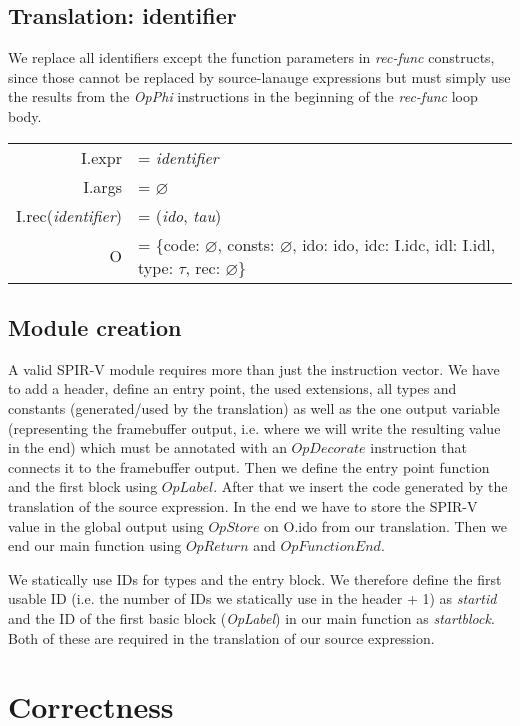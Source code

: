 \documentclass[letterpaper,12pt]{article}
\begin{document}
\subsection{Translation: identifier}

We replace all identifiers except the function parameters in \textit{rec-func}
constructs, since those cannot be replaced by source-lanauge expressions
but must simply use the results from the \textit{OpPhi} instructions
in the beginning of the \textit{rec-func} loop body.

\medskip
\begin{tabularx}{\linewidth}{rl}
	I.expr &= \textit{identifier} \\
	I.args &= $\varnothing$ \\
	I.rec(\textit{identifier}) &= (\textit{ido}, \textit{tau}) \\
	O &= \{code: $\varnothing$, consts: $\varnothing$, ido: ido, idc: I.idc, idl: I.idl, type: $\tau$, rec: $\varnothing$\} \\
\end{tabularx}

\subsection{Module creation}

A valid SPIR-V module requires more than just the instruction vector.
We have to add a header, define an entry point, the used extensions,
all types and constants (generated/used by the translation) as well as the one
output variable (representing the framebuffer output, i.e. where we will
write the resulting value in the end) which must be annotated with
an $OpDecorate$ instruction that connects it to the framebuffer output.
Then we define the entry point function and the first block using
$OpLabel$. After that we insert the code generated by the translation
of the source expression. In the end we have to store the SPIR-V value
in the global output using $OpStore$ on O.ido from our translation.
Then we end our main function using $OpReturn$ and $OpFunctionEnd$.

We statically use IDs for types and the entry block. We therefore
define the first usable ID (i.e. the number of IDs we statically use in
the header + 1) as \textit{startid} and the ID of the first basic
block (\textit{OpLabel}) in our main function as \textit{startblock}.
Both of these are required in the translation of our source
expression.

\section{Correctness}
\end{document}
